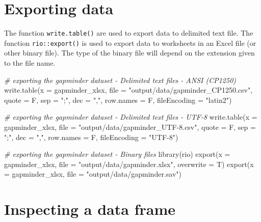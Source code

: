 \documentclass[
]{book}
\newenvironment{Shaded}{\begin{snugshade}}{\end{snugshade}}
\newcommand{\AttributeTok}[1]{\textcolor[rgb]{0.77,0.63,0.00}{#1}}
\newcommand{\CommentTok}[1]{\textcolor[rgb]{0.56,0.35,0.01}{\textit{#1}}}
\newcommand{\FunctionTok}[1]{\textcolor[rgb]{0.00,0.00,0.00}{#1}}
\newcommand{\NormalTok}[1]{#1}
\newcommand{\StringTok}[1]{\textcolor[rgb]{0.31,0.60,0.02}{#1}}
\begin{document}
\hypertarget{br-export}{%
\section{Exporting data}\label{br-export}}

The function \texttt{write.table()} are used to export data to delimited text file. The function \texttt{rio::export()} is used to export data to worksheets in an Excel file (or other binary file). The type of the binary file will depend on the extension given to the file name.

\begin{Shaded}
\begin{Highlighting}[]
\CommentTok{\# exporting the gapminder dataset {-} Delimited text files {-} ANSI (CP1250)}
\FunctionTok{write.table}\NormalTok{(}\AttributeTok{x =}\NormalTok{ gapminder\_xlsx, }\AttributeTok{file =} \StringTok{"output/data/gapminder\_CP1250.csv"}\NormalTok{, }\AttributeTok{quote =}\NormalTok{ F, }\AttributeTok{sep =} \StringTok{";"}\NormalTok{, }\AttributeTok{dec =} \StringTok{","}\NormalTok{, }\AttributeTok{row.names =}\NormalTok{ F, }\AttributeTok{fileEncoding =} \StringTok{"latin2"}\NormalTok{)}

\CommentTok{\# exporting the gapminder dataset {-} Delimited text files {-} UTF{-}8}
\FunctionTok{write.table}\NormalTok{(}\AttributeTok{x =}\NormalTok{ gapminder\_xlsx, }\AttributeTok{file =} \StringTok{"output/data/gapminder\_UTF{-}8.csv"}\NormalTok{, }\AttributeTok{quote =}\NormalTok{ F, }\AttributeTok{sep =} \StringTok{";"}\NormalTok{, }\AttributeTok{dec =} \StringTok{","}\NormalTok{, }\AttributeTok{row.names =}\NormalTok{ F, }\AttributeTok{fileEncoding =} \StringTok{"UTF{-}8"}\NormalTok{)}

\CommentTok{\# exporting the gapminder dataset {-} Binary files}
\FunctionTok{library}\NormalTok{(rio)}
\FunctionTok{export}\NormalTok{(}\AttributeTok{x =}\NormalTok{ gapminder\_xlsx, }\AttributeTok{file =} \StringTok{"output/data/gapminder.xlsx"}\NormalTok{, }\AttributeTok{overwrite =}\NormalTok{ T)}
\FunctionTok{export}\NormalTok{(}\AttributeTok{x =}\NormalTok{ gapminder\_xlsx, }\AttributeTok{file =} \StringTok{"output/data/gapminder.sav"}\NormalTok{)}
\end{Highlighting}
\end{Shaded}

\hypertarget{br-inspect}{%
\section{Inspecting a data frame}\label{br-inspect}}
\end{document}
